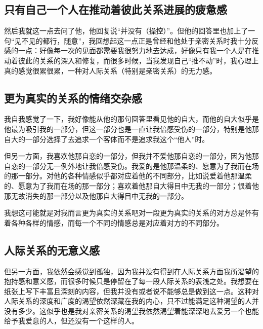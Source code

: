 


\subsection*{只有自己一个人在推动着彼此关系进展的疲惫感}

然后我就这一点去问了他，他回复说“并没有（操控）”。但他的回答里也加上了一句“见不见的都行，随意”，我回想起这一点正是曾经和他处于亲密关系时我十分反感的一点：好像每一次的见面都需要我很努力地去达成，好像只有我一个人是在推动着彼此的关系的深入和修复，而很多时候，当我发现自己“推不动”时，我心理上真的感觉很累很累，一种对人际关系（特别是亲密关系）的无力感。




\subsection*{更为真实的关系的情绪交杂感}

我自我感觉了一下，我好像能从他的那句回答里看见他的自大，而他的自大似乎是他最为吸引我的一部分，但这一部分也是一直让我倍感受伤的一部分，特别是他那自大的一部分选择了去追求一个客体而不是追求我这个“他人”时。

但另一方面，我喜欢他那自恋的一部分，但我并不爱他那自恋的一部分，因为他那自恋的一部分无一例外地让我倍感受伤。我爱的是他那温柔的、愿意为了我而在场的那一部分。对他的各种情感似乎都对应着他的不同部分，比如说爱着他那温柔的、愿意为了我而在场的那一部分；喜欢着他那自大得目中无我的一部分；恨着他那无故消失的那一部分以及他那自大得目中无我的一部分。

我想这可能就是对我而言更为真实的关系吧\pozhehao{}对一段更为真实的关系的对方总是怀有着各种各样的情感，而每一个不同的情感总是对应着对方的不同部分。




\subsection*{人际关系的无意义感}

但另一方面，我依然会感觉到孤独，因为我并没有得到在人际关系方面我所渴望的抱持感和意义感，而很多时候只是停留在了每一段人际关系的表浅之处。我想要在纸张上写下丰富且深刻的内容，但我并没有或者说不能够总是做到这一点。这种对人际关系的深度和广度的渴望依然深藏在我的内心，只不过能满足这种渴望的人并没有多少。这似乎也是我对亲密关系的渴望\pozhehao{}我依然渴望着能深深地去爱另一个也能给予我爱意的人，但还没有一个这样的人。

